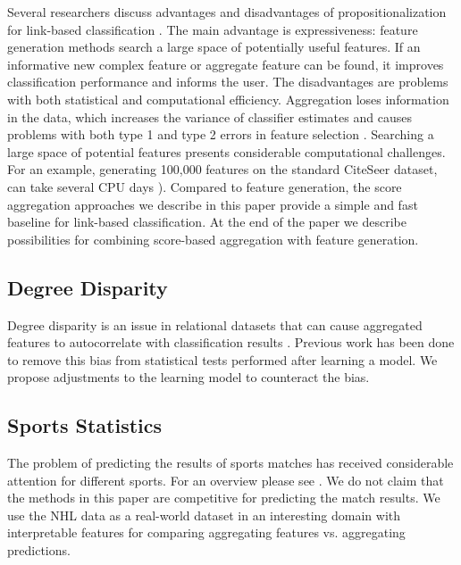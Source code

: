 \documentclass[conference]{IEEEtran}
\begin{document}
Several researchers discuss advantages and disadvantages of  propositionalization for link-based classification \cite{DavidJensen2002,han2009}.
The main advantage is expressiveness: feature generation methods search a large space of potentially useful features. If an informative new complex feature or aggregate feature can be found, it improves classification performance and informs the user. The disadvantages are problems with both statistical and computational efficiency. Aggregation loses information in the data, which increases the variance of classifier estimates and causes problems with both type 1 and type 2 errors in feature selection \cite{Jensen2002a}. Searching a large space of potential features presents considerable computational challenges. For an example, generating 100,000 features on the standard CiteSeer dataset, can take several CPU days
\cite[Ch.16.1.2]{Popescul2007}). Compared to feature generation, the score aggregation approaches we describe in this paper provide a simple and fast baseline for link-based classification. At the end of the paper we describe possibilities for combining score-based aggregation with feature generation.

\subsection{Degree Disparity} Degree disparity is an issue in relational datasets that can cause aggregated features to autocorrelate with classification results \cite{Jensen2003}. Previous work has been done to remove this bias from statistical tests performed after learning a model. We propose adjustments to the learning model to counteract the bias.

\subsection{Sports Statistics} The problem of predicting the results of sports matches has received considerable attention for different sports. For an overview please see \cite{Schumaker2010}. We do not claim that the methods in this paper are competitive for predicting the match results.
We use the NHL data as a real-world dataset in an interesting domain with interpretable features for comparing aggregating features vs. aggregating predictions.
\end{document}
